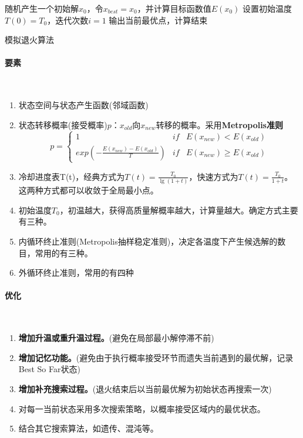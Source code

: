 \begin{algorithm}[htb]
  \small
  \SetAlgoLined

  随机产生一个初始解$x_0$，令$x_{best}=x_0$，并计算目标函数值$E(x_0)$\;
  设置初始温度$T(0)=T_0$，迭代次数$i=1$\;
  输出当前最优点，计算结束\;

  \caption{模拟退火算法}
  \label{algo:simulatedannealing}
\end{algorithm}

\paragraph{要素}~{}

\begin{enumerate}
    \item 状态空间与状态产生函数(邻域函数)
    \item 状态转移概率(接受概率)$p$：$x_{old}$向$x_{new}$转移的概率。采用\textbf{Metropolis准则}
    $$p=\left\{\begin{matrix}
        1 & if & E(x_{new})<E(x_{old}) \\ 
        exp(-\frac{E(x_{new})-E(x_{old})}{T}) & if & E(x_{new})\geq{}E(x_{old})
      \end{matrix}\right.$$
    \item 冷却进度表T(t)，经典方式为$T(t)=\frac{T_0}{\lg(1+t)}$，快速方式为$T(t)=\frac{T_0}{1+t}$。这两种方式都可以收敛于全局最小点。
    \item 初始温度$T_0$，初温越大，获得高质量解概率越大，计算量越大。确定方式主要有三种。
    \item 内循环终止准则(Metropolis抽样稳定准则)，决定各温度下产生候选解的数目，常用的有三种。
    \item 外循环终止准则，常用的有四种
\end{enumerate}

\paragraph{优化}~{}

\begin{enumerate}
    \item \textbf{增加升温或重升温过程。}(避免在局部最小解停滞不前)
    \item \textbf{增加记忆功能。}(避免由于执行概率接受环节而遗失当前遇到的最优解，记录Best So Far状态)
    \item \textbf{增加补充搜索过程。}(退火结束后以当前最优解为初始状态再搜索一次)
    \item 对每一当前状态采用多次搜索策略，以概率接受区域内的最优状态。
    \item 结合其它搜索算法，如遗传、混沌等。
\end{enumerate}
